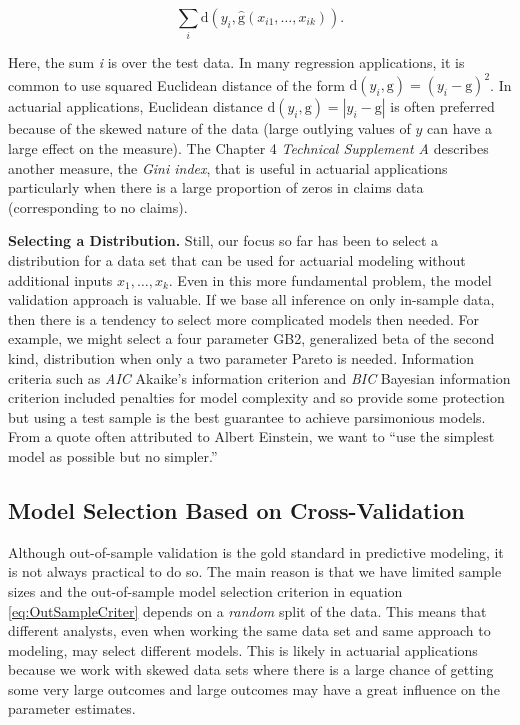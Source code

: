 \documentclass[]{book}
\theoremstyle{definition}
\theoremstyle{definition}
\theoremstyle{definition}
\theoremstyle{remark}
\begin{document}
\begin{equation}
\sum_i \mathrm{d}(y_i,\hat{\mathrm{g}}\left(x_{i1}, \ldots, x_{ik}\right) ) .
\label{eq:OutSampleCriter}
\end{equation}

Here, the sum \emph{i} is over the test data. In many regression
applications, it is common to use squared Euclidean distance of the form
\(\mathrm{d}(y_i,\mathrm{g}) = (y_i-\mathrm{g})^2\). In actuarial
applications, Euclidean distance
\(\mathrm{d}(y_i,\mathrm{g}) = |y_i-\mathrm{g}|\) is often preferred
because of the skewed nature of the data (large outlying values of \(y\)
can have a large effect on the measure). The Chapter 4 \emph{Technical
Supplement A} describes another measure, the \emph{Gini index}, that is
useful in actuarial applications particularly when there is a large
proportion of zeros in claims data (corresponding to no claims).

\textbf{Selecting a Distribution.} Still, our focus so far has been to
select a distribution for a data set that can be used for actuarial
modeling without additional inputs \(x_1, \ldots, x_k\). Even in this
more fundamental problem, the model validation approach is valuable. If
we base all inference on only in-sample data, then there is a tendency
to select more complicated models then needed. For example, we might
select a four parameter GB2, generalized beta of the second kind,
distribution when only a two parameter Pareto is needed. Information
criteria such as \emph{AIC}{ Akaike's information criterion} and
\emph{BIC}{ Bayesian information criterion} included penalties for model
complexity and so provide some protection but using a test sample is the
best guarantee to achieve parsimonious models. From a quote often
attributed to Albert Einstein, we want to ``use the simplest model as
possible but no simpler.''

\subsection{Model Selection Based on
Cross-Validation}\label{model-selection-based-on-cross-validation}

Although out-of-sample validation is the gold standard in predictive
modeling, it is not always practical to do so. The main reason is that
we have limited sample sizes and the out-of-sample model selection
criterion in equation \eqref{eq:OutSampleCriter} depends on a
\emph{random} split of the data. This means that different analysts,
even when working the same data set and same approach to modeling, may
select different models. This is likely in actuarial applications
because we work with skewed data sets where there is a large chance of
getting some very large outcomes and large outcomes may have a great
influence on the parameter estimates.
\end{document}
